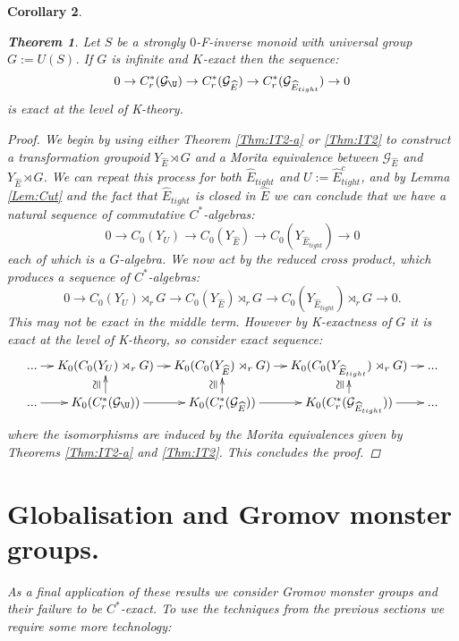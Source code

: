 \documentclass[11pt]{amsart}
\theoremstyle{plain}
\newtheorem{theorem}{Theorem}%
\newtheorem{corollary}[theorem]{Corollary}%
\theoremstyle{definition}%
\theoremstyle{remark}%
\newcommand{\G}{\mathcal{G}}
\newcommand{\E}{\widehat{E}}
\newcommand{\ucong}{\rotatebox{90}{$\cong$}}
\begin{document}
\begin{corollary}
\begin{theorem}\label{thm:PV2}
Let $S$ be a strongly $0$-F-inverse monoid with universal group $G:=U(S)$. If $G$ is infinite and $K$-exact then the sequence:
\begin{equation*}
0 \rightarrow C^{*}_{r}(\G_{\U}) \rightarrow C^{*}_{r}(\G_{\E}) \rightarrow C^{*}_{r}(\G_{\E_{tight}}) \rightarrow 0
\end{equation*}
is exact at the level of K-theory.  
\end{theorem}
\begin{proof}
We begin by using either Theorem \ref{Thm:IT2-a} or \ref{Thm:IT2} to construct a transformation groupoid $Y_{\E}\rtimes G$ and a Morita equivalence between $\G_{\E}$ and $Y_{\E}\rtimes G$. We can repeat this process for both $\E_{tight}$ and $U:=\E_{tight}^{c}$, and by Lemma \ref{Lem:Cut} and the fact that $\E_{tight}$ is closed in $\E$ we can conclude that we have a natural sequence of commutative $C^{*}$-algebras:
\begin{equation*}
0 \rightarrow C_{0}(Y_{U}) \rightarrow C_{0}(Y_{\E}) \rightarrow C_{0}(Y_{\E_{tight}}) \rightarrow 0
\end{equation*}
each of which is a $G$-algebra. We now act by the reduced cross product, which produces a sequence of $C^{*}$-algebras:
\begin{equation*}
0 \rightarrow C_{0}(Y_{U})\rtimes_{r}G \rightarrow C_{0}(Y_{\E})\rtimes_{r}G \rightarrow C_{0}(Y_{\E_{tight}})\rtimes_{r}G \rightarrow 0.
\end{equation*}
This may not be exact in the middle term. However by K-exactness of $G$ it is exact at the level of K-theory, so consider exact sequence:
\begin{equation*}
\xymatrix@=1em{...\ar[r] & K_{0}(C_{0}(Y_{U})\rtimes_{r} G) \ar[r]& K_{0}(C_{0}(Y_{\E})\rtimes_{r} G) \ar[r]& K_{0}(C_{0}(Y_{\E_{tight}})\rtimes_{r} G)\ar[r] & ...\\
...\ar[r] & K_{0}(C^{*}_{r}(\G_{\U})) \ar[r]\ar[u]^{\ucong}& K_{0}(C^{*}_{r}(\G_{\E})) \ar[r]\ar[u]^{\ucong}& K_{0}(C^{*}_{r}(\G_{\E_{tight}})) \ar[r]\ar[u]^{\ucong}& ...}
\end{equation*}
where the isomorphisms are induced by the Morita equivalences given by Theorems \ref{Thm:IT2-a} and \ref{Thm:IT2}. This concludes the proof.
\end{proof}

\section{Globalisation and Gromov monster groups.}\label{sect:S5}
As a final application of these results we consider Gromov monster groups and their failure to be $C^{*}$-exact. To use the techniques from the previous sections we require some more technology:


\end{corollary}
\end{document}
